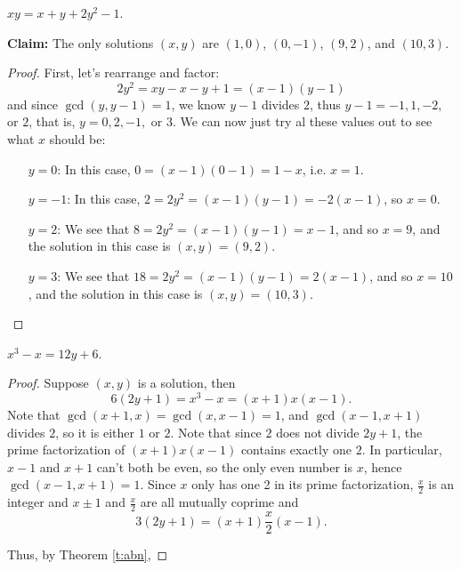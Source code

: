 \documentclass[11pt,dvipsnames]{book}
\numberwithin{figure}{section} %
\numberwithin{table}{section} %
\begin{document}
\begin{exercise}
$xy= x+y+2y^2-1$.

\begin{solution}

{\bf Claim:} The only solutions $(x,y)$ are $(1,0)$, $(0,-1)$, $(9,2)$, and $(10,3)$.

\begin{proof}

First, let's rearrange and factor:
\[
2y^2=xy-x-y+1 = (x-1)(y-1)
\]
and since $\gcd(y,y-1)=1$, we know $y-1$ divides $2$, thus $y-1=-1,1,-2,$ or $2$, that is, $y=0,2,-1, $ or $3$. We can now just try al these values out to see what $x$ should be:
\begin{itemize}
\item[$y=0$:] In this case, $0=(x-1)(0-1)=1-x$, i.e. $x=1$.
\item[$y=-1$:] In this case, $2=2y^2=(x-1)(y-1)=-2(x-1)$, so $x=0$.
\item[$y=2$:] We see that $8=2y^2 = (x-1)(y-1)=x-1$, and so $x=9$, and the solution in this case is $(x,y)=(9,2)$.
\item[$y=3$:] We see that $18=2y^2 = (x-1)(y-1)=2(x-1)$, and so $x=10$, and the solution in this case is $(x,y)=(10,3)$.
\end{itemize}
\end{proof}
\end{solution}

\end{exercise}

\begin{exercise}
 $x^3-x=12y+6$.

\begin{solution}

\begin{proof}
Suppose $(x,y)$ is a solution, then
\[
6(2y+1) = x^3-x = (x+1)x(x-1).
\]
Note that $\gcd(x+1,x)=\gcd(x,x-1)=1$, and $\gcd(x-1,x+1)$ divides $2$, so it is either $1$ or $2$. Note that since $2$ does not divide $2y+1$, the prime factorization of $(x+1)x(x-1)$ contains exactly one $2$. In particular, $x-1$ and $x+1$ can't both be even, so the only even number is $x$, hence $\gcd(x-1,x+1)=1$. Since $x$ only has one 2 in its prime factorization, $\frac{x}{2}$ is an integer and $x\pm 1$ and $\frac{x}{2}$ are all mutually coprime and
\[
3(2y+1)=(x+1)\frac{x}{2}(x-1).
\]

Thus, by Theorem \ref{t:abn},

\end{proof}

\end{solution}

\end{exercise}
\end{document}
